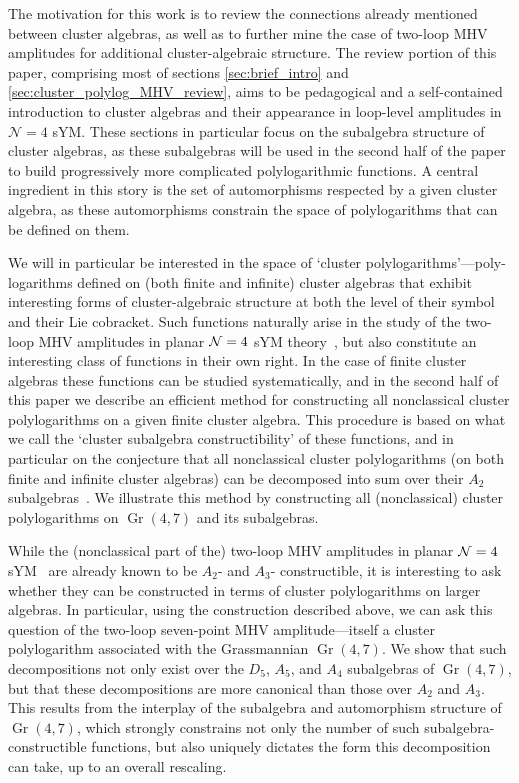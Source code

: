 \documentclass[12pt]{article}
\DeclareMathOperator{\Gr}{Gr}
\begin{document}
The motivation for this work is to review the connections already mentioned between cluster algebras, as well as to further mine the case of two-loop MHV amplitudes for additional cluster-algebraic structure. The review portion of this paper, comprising most of sections \ref{sec:brief_intro} and \ref{sec:cluster_polylog_MHV_review}, aims to be pedagogical and a self-contained introduction to cluster algebras and their appearance in loop-level amplitudes in $\mathcal{N}=4$ sYM. These sections in particular focus on the subalgebra structure of cluster algebras, as these subalgebras will be used in the second half of the paper to build progressively more complicated polylogarithmic functions. A central ingredient in this story is the set of automorphisms respected by a given cluster algebra, as these automorphisms constrain the space of polylogarithms that can be defined on them.

We will in particular be interested in the space of `cluster polylogarithms'---poly- logarithms defined on (both finite and infinite) cluster algebras that exhibit interesting forms of cluster-algebraic structure at both the level of their symbol and their Lie cobracket. Such functions naturally arise in the study of the two-loop MHV amplitudes in planar ${\cal N} =4$ sYM theory~\cite{Golden:2014xqa}, but also constitute an interesting class of functions in their own right. In the case of finite cluster algebras these functions can be studied systematically, and in the second half of this paper we describe an efficient method for constructing all nonclassical cluster polylogarithms on a given finite cluster algebra. This procedure is based on what we call the `cluster subalgebra constructibility' of these functions, and in particular on the conjecture that all nonclassical cluster polylogarithms (on both finite and infinite cluster algebras) can be decomposed into sum over their $A_2$ subalgebras~\cite{Golden:2014xqa}. We illustrate this method by constructing all (nonclassical) cluster polylogarithms on $\Gr(4,7)$ and its subalgebras.

While the (nonclassical part of the) two-loop MHV amplitudes in planar ${\cal N} =4$ sYM~\cite{Golden:2014xqa} are already known to be $A_2$- and $A_3$- constructible, it is interesting to ask whether they can be constructed in terms of cluster polylogarithms on larger algebras. In particular, using the construction described above, we can ask this question of the two-loop seven-point MHV amplitude---itself a cluster polylogarithm associated with the Grassmannian $\Gr(4,7)$. We show that such decompositions not only exist over the $D_5$, $A_5$, and $A_4$ subalgebras of $\Gr(4,7)$, but that these decompositions are more canonical than those over $A_2$ and $A_3$. This results from the interplay of the subalgebra and automorphism structure of $\Gr(4,7)$, which strongly constrains not only the number of such subalgebra-constructible functions, but also uniquely dictates the form this decomposition can take, up to an overall rescaling.
\end{document}

